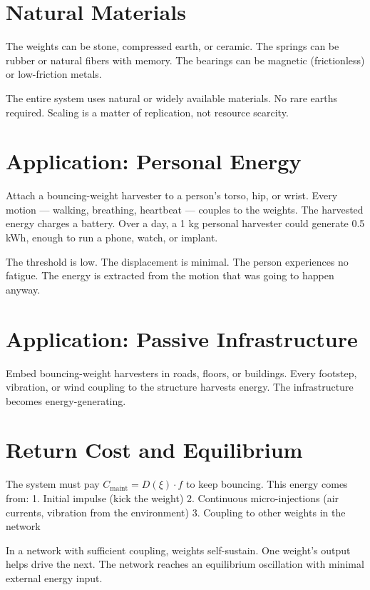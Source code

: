 \documentclass[12pt]{article}
\begin{document}
\section{Natural Materials}

The weights can be stone, compressed earth, or ceramic. The springs can be rubber or natural fibers with memory. The bearings can be magnetic (frictionless) or low-friction metals.

The entire system uses natural or widely available materials. No rare earths required. Scaling is a matter of replication, not resource scarcity.

\section{Application: Personal Energy}

Attach a bouncing-weight harvester to a person's torso, hip, or wrist. Every motion — walking, breathing, heartbeat — couples to the weights. The harvested energy charges a battery. Over a day, a 1 kg personal harvester could generate 0.5 kWh, enough to run a phone, watch, or implant.

The threshold is low. The displacement is minimal. The person experiences no fatigue. The energy is extracted from the motion that was going to happen anyway.

\section{Application: Passive Infrastructure}

Embed bouncing-weight harvesters in roads, floors, or buildings. Every footstep, vibration, or wind coupling to the structure harvests energy. The infrastructure becomes energy-generating.

\section{Return Cost and Equilibrium}

The system must pay $C_{\text{maint}} = D(\xi) \cdot f$ to keep bouncing. This energy comes from:
1. Initial impulse (kick the weight)
2. Continuous micro-injections (air currents, vibration from the environment)
3. Coupling to other weights in the network

In a network with sufficient coupling, weights self-sustain. One weight's output helps drive the next. The network reaches an equilibrium oscillation with minimal external energy input.
\end{document}
